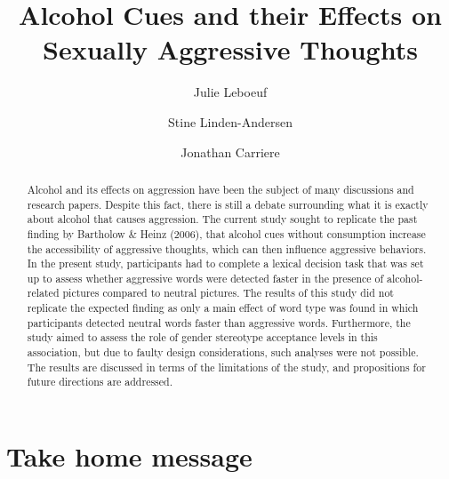 \documentclass[serif, authordate, twocolumn, empirical]{jote-article}
\title{Alcohol Cues and their Effects on Sexually Aggressive Thoughts}
\author[1]{Julie Leboeuf}
\author[1]{Stine Linden-Andersen}
\author[1]{Jonathan Carriere}
\affil[1]{Department of Psychology, Bishop’s University, Sherbrooke, Quebec, J1M 1Z7, Canada}
\begin{document}
\begin{frontmatter}
\maketitle
\setcounter{page}{9}
\begin{abstract}
\noindent Alcohol and its effects on aggression have been the subject of many discussions and research papers. Despite this fact, there is still a debate surrounding what it is exactly about alcohol that causes aggression. The current study sought to replicate the past finding by Bartholow \& Heinz (2006), that alcohol cues without consumption increase the accessibility of aggressive thoughts, which can then influence aggressive behaviors. In the present study, participants had to complete a lexical decision task that was set up to assess whether aggressive words were detected faster in the presence of alcohol-related pictures compared to neutral pictures. The results of this study did not replicate the expected finding as only a main effect of word type was found in which participants detected neutral words faster than aggressive words. Furthermore, the study aimed to assess the role of gender stereotype acceptance levels in this association, but due to faulty design considerations, such analyses were not possible. The results are discussed in terms of the limitations of the study, and propositions for future directions are addressed. 

\end{abstract}
\end{frontmatter}

{}
\section*{Take home message} %
\label{sec:take-home}
\end{document}
